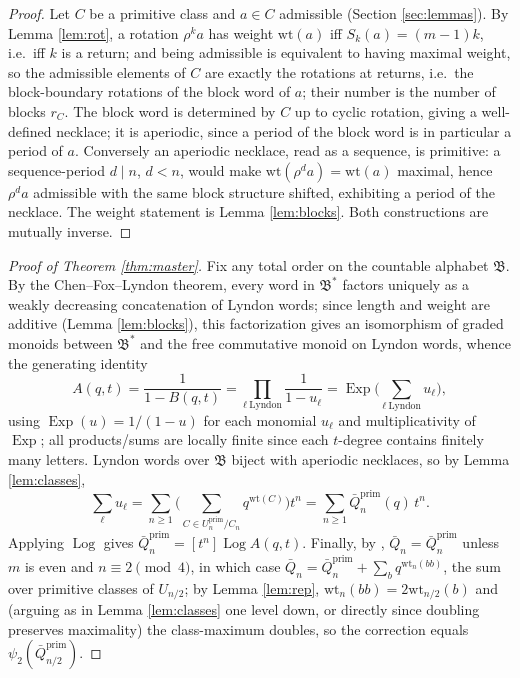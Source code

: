 \documentclass[11pt]{amsart}
\theoremstyle{definition}
\newcommand{\wt}{\mathrm{wt}}
\newcommand{\prim}{\mathrm{prim}}
\newcommand{\Exp}{\operatorname{Exp}}
\newcommand{\PLog}{\operatorname{Log}}
\begin{document}
\begin{proof}
Let $C$ be a primitive class and $a\in C$ admissible (Section \ref{sec:lemmas}). By Lemma \ref{lem:rot}, a rotation $\rho^ka$ has weight $\wt(a)$ iff $S_k(a)=(m-1)k$, i.e.\ iff $k$ is a return; and being admissible is equivalent to having maximal weight, so the admissible elements of $C$ are exactly the rotations at returns, i.e.\ the block-boundary rotations of the block word of $a$; their number is the number of blocks $r_C$. The block word is determined by $C$ up to cyclic rotation, giving a well-defined necklace; it is aperiodic, since a period of the block word is in particular a period of $a$. Conversely an aperiodic necklace, read as a sequence, is primitive: a sequence-period $d\mid n$, $d<n$, would make $\wt(\rho^d a)=\wt(a)$ maximal, hence $\rho^da$ admissible with the same block structure shifted, exhibiting a period of the necklace. The weight statement is Lemma \ref{lem:blocks}. Both constructions are mutually inverse.
\end{proof}

\begin{proof}[Proof of Theorem \ref{thm:master}]
Fix any total order on the countable alphabet $\mathfrak B$. By the Chen--Fox--Lyndon theorem, every word in $\mathfrak B^*$ factors uniquely as a weakly decreasing concatenation of Lyndon words; since length and weight are additive (Lemma \ref{lem:blocks}), this factorization gives an isomorphism of graded monoids between $\mathfrak B^*$ and the free commutative monoid on Lyndon words, whence the generating identity
\[
A(q,t)=\frac1{1-B(q,t)}=\prod_{\ell\ \text{Lyndon}}\frac1{1-u_\ell}
=\Exp\Big(\sum_{\ell\ \text{Lyndon}}u_\ell\Big),
\]
using $\Exp(u)=1/(1-u)$ for each monomial $u_\ell$ and multiplicativity of $\Exp$; all products/sums are locally finite since each $t$-degree contains finitely many letters. Lyndon words over $\mathfrak B$ biject with aperiodic necklaces, so by Lemma \ref{lem:classes},
\[
\sum_{\ell}u_\ell=\sum_{n\ge1}\Big(\sum_{C\in U^{\prim}_n/C_n}q^{\wt(C)}\Big)t^n=\sum_{n\ge1}\bar Q^{\prim}_n(q)\,t^n .
\]
Applying $\PLog$ gives $\bar Q^{\prim}_n=[t^n]\PLog A(q,t)$. Finally, by \cite[Thm.~5.11 and \S6]{Rei1102}, $\bar Q_n=\bar Q^{\prim}_n$ unless $m$ is even and $n\equiv2\pmod4$, in which case $\bar Q_n=\bar Q^{\prim}_n+\sum_{b}q^{\wt_n(bb)}$, the sum over primitive classes of $U_{n/2}$; by Lemma \ref{lem:rep}, $\wt_n(bb)=2\wt_{n/2}(b)$ and (arguing as in Lemma \ref{lem:classes} one level down, or directly since doubling preserves maximality) the class-maximum doubles, so the correction equals $\psi_2(\bar Q^{\prim}_{n/2})$.
\end{proof}
\end{document}
